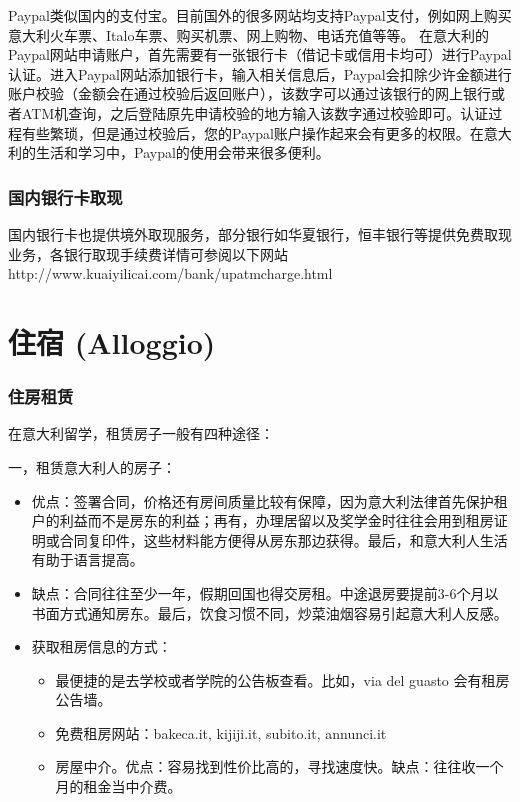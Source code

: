 Paypal类似国内的支付宝。目前国外的很多网站均支持Paypal支付，例如网上购买意大利火车票、Italo车票、购买机票、网上购物、电话充值等等。
在意大利的Paypal网站申请账户，首先需要有一张银行卡（借记卡或信用卡均可）进行Paypal认证。进入Paypal网站添加银行卡，输入相关信息后，Paypal会扣除少许金额进行账户校验（金额会在通过校验后返回账户），该数字可以通过该银行的网上银行或者ATM机查询，之后登陆原先申请校验的地方输入该数字通过校验即可。认证过程有些繁琐，但是通过校验后，您的Paypal账户操作起来会有更多的权限。在意大利的生活和学习中，Paypal的使用会带来很多便利。

\subsubsection{国内银行卡取现}
国内银行卡也提供境外取现服务，部分银行如华夏银行，恒丰银行等提供免费取现业务，各银行取现手续费详情可参阅以下网站\\
 http://www.kuaiyilicai.com/bank/upatmcharge.html

\section{住宿 (Alloggio)}
\subsubsection{住房租赁}

在意大利留学，租赁房子一般有四种途径：

一，租赁意大利人的房子：
\begin{itemize} 
\item 优点：签署合同，价格还有房间质量比较有保障，因为意大利法律首先保护租户的利益而不是房东的利益；再有，办理居留以及奖学金时往往会用到租房证明或合同复印件，这些材料能方便得从房东那边获得。最后，和意大利人生活有助于语言提高。
\item 缺点：合同往往至少一年，假期回国也得交房租。中途退房要提前3-6个月以书面方式通知房东。最后，饮食习惯不同，炒菜油烟容易引起意大利人反感。
\item 获取租房信息的方式：
\begin{itemize}
	\item 最便捷的是去学校或者学院的公告板查看。比如，via del guasto 会有租房公告墙。
	\item 免费租房网站：bakeca.it, kijiji.it,  subito.it, annunci.it
	\item 房屋中介。优点：容易找到性价比高的，寻找速度快。缺点：往往收一个月的租金当中介费。
\end{itemize} 
\end{itemize} 

